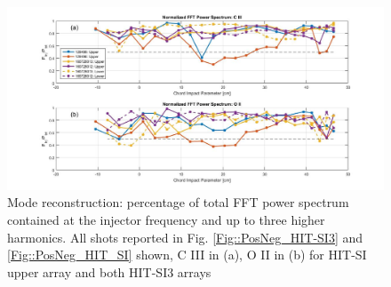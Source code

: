 \begin{center}
\begin{figure}
\hspace*{-10ex}\includegraphics[width=8in]{FFT_3}\caption{Mode reconstruction: percentage of total FFT power spectrum contained at the injector frequency and up to three higher harmonics. All shots reported in Fig. \ref{Fig::PosNeg_HIT-SI3} and \ref{Fig::PosNeg_HIT_SI} shown, C III in (a), O II in (b) for HIT-SI upper array and both HIT-SI3 arrays}\label{Fig::FFT Spect}
\end{figure}
\end{center}



